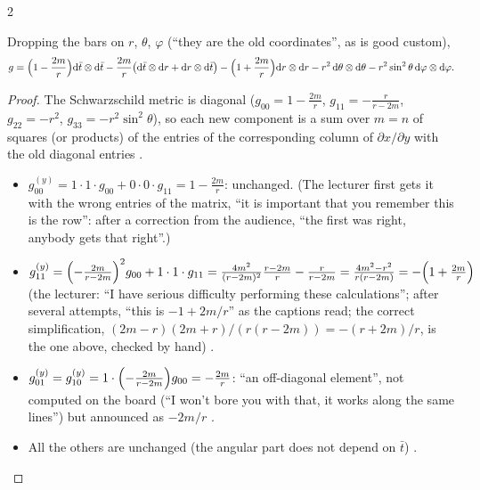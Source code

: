 \begin{paracol}{2}
\begin{theorem}\label{thm:c22-ef-metric}
Dropping the bars on $r$, $\theta$, $\varphi$ (``they are the old coordinates'', as is good custom),
\[
  g=\Bigl(1-\frac{2m}{r}\Bigr)\mathrm d\bar t\otimes\mathrm d\bar t-\frac{2m}{r}\bigl(\mathrm d\bar t\otimes\mathrm dr+\mathrm dr\otimes\mathrm d\bar t\bigr)-\Bigl(1+\frac{2m}{r}\Bigr)\mathrm dr\otimes\mathrm dr-r^2\,\mathrm d\theta\otimes\mathrm d\theta-r^2\sin^2\theta\,\mathrm d\varphi\otimes\mathrm d\varphi .
\]
\end{theorem}
\begin{proof}
The Schwarzschild metric is diagonal ($g_{00}=1-\frac{2m}r$, $g_{11}=-\frac r{r-2m}$, $g_{22}=-r^2$, $g_{33}=-r^2\sin^2\theta$), so each new component is a sum over $m=n$ of squares (or products) of the entries of the corresponding column of $\partial x/\partial y$ with the old diagonal entries .
\begin{itemize}
  \item $g^{(y)}_{00}=1\cdot1\cdot g_{00}+0\cdot0\cdot g_{11}=1-\frac{2m}r$: unchanged. (The lecturer first gets it with the wrong entries of the matrix, ``it is important that you remember this is the row'': after a correction from the audience, ``the first was right, anybody gets that right''.) 
  \item $g^{(y)}_{11}=\Bigl(-\frac{2m}{r-2m}\Bigr)^2g_{00}+1\cdot1\cdot g_{11}=\frac{4m^2}{(r-2m)^2}\frac{r-2m}{r}-\frac r{r-2m}=\frac{4m^2-r^2}{r(r-2m)}=-\Bigl(1+\frac{2m}r\Bigr)$ (the lecturer: ``I have serious difficulty performing these calculations''; after several attempts, ``this is $-1+2m/r$'' as the captions read; the correct simplification, $(2m-r)(2m+r)/(r(r-2m))=-(r+2m)/r$, is the one above, checked by hand) .
  \item $g^{(y)}_{01}=g^{(y)}_{10}=1\cdot\Bigl(-\frac{2m}{r-2m}\Bigr)g_{00}=-\frac{2m}{r}$: ``an off-diagonal element'', not computed on the board (``I won't bore you with that, it works along the same lines'') but announced as $-2m/r$ .
  \item All the others are unchanged (the angular part does not depend on $\bar t$) .

\end{itemize}
\end{proof}
\end{paracol}
